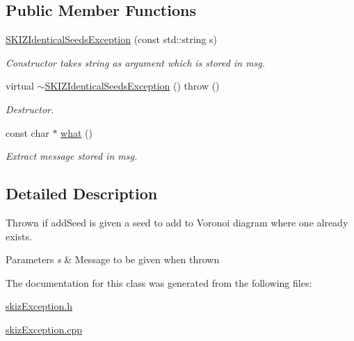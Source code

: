 \subsection*{Public Member Functions}
\begin{DoxyCompactItemize}
\item 
\mbox{\label{classSKIZIdenticalSeedsException_a776554e938f17373b9de355c81eb78e3}} 
\mbox{\hyperlink{classSKIZIdenticalSeedsException_a776554e938f17373b9de355c81eb78e3}{S\+K\+I\+Z\+Identical\+Seeds\+Exception}} (const std\+::string s)
\begin{DoxyCompactList}\small\item\em Constructor takes string as argument which is stored in msg. \end{DoxyCompactList}\item 
\mbox{\label{classSKIZIdenticalSeedsException_addce88717ce4fe89ef5d431e7fdff84b}} 
virtual \mbox{\hyperlink{classSKIZIdenticalSeedsException_addce88717ce4fe89ef5d431e7fdff84b}{$\sim$\+S\+K\+I\+Z\+Identical\+Seeds\+Exception}} ()  throw ()
\begin{DoxyCompactList}\small\item\em Destructor. \end{DoxyCompactList}\item 
\mbox{\label{classSKIZIdenticalSeedsException_a1edd2deac7bafc875e21c67d114494ae}} 
const char $\ast$ \mbox{\hyperlink{classSKIZIdenticalSeedsException_a1edd2deac7bafc875e21c67d114494ae}{what}} ()
\begin{DoxyCompactList}\small\item\em Extract message stored in msg. \end{DoxyCompactList}\end{DoxyCompactItemize}


\subsection{Detailed Description}
Thrown if add\+Seed is given a seed to add to Voronoi diagram where one already exists. 


\begin{DoxyParams}{Parameters}
{\em s} & Message to be given when thrown \\
\hline
\end{DoxyParams}


The documentation for this class was generated from the following files\+:\begin{DoxyCompactItemize}
\item 
\mbox{\hyperlink{skizException_8h}{skiz\+Exception.\+h}}\item 
\mbox{\hyperlink{skizException_8cpp}{skiz\+Exception.\+cpp}}\end{DoxyCompactItemize}
